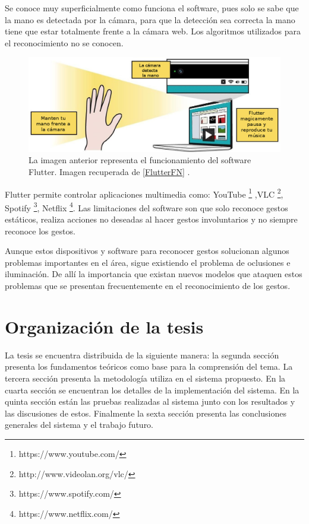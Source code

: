 Se conoce muy superficialmente como funciona el software, pues solo se sabe que la mano es detectada por la cámara, para que la detección sea correcta la mano tiene que estar totalmente frente a la cámara web. Los algoritmos utilizados para el reconocimiento no se conocen.  
\begin{figure}[h!]
\begin{center}
\includegraphics[scale=.4]{./Figures/Flutter.jpg}
\end{center}
\caption{La imagen anterior representa el funcionamiento del software Flutter. Imagen recuperada de \ref{FlutterFN} .}
\label{fig:Flutter}
\end{figure}

Flutter permite controlar aplicaciones multimedia como: YouTube \footnote{https://www.youtube.com/} ,VLC \footnote{http://www.videolan.org/vlc/}, Spotify \footnote{https://www.spotify.com/}, Netflix \footnote{https://www.netflix.com/}. Las limitaciones del software son que solo reconoce gestos estáticos, realiza acciones no deseadas al hacer gestos involuntarios y no siempre reconoce los gestos.  


Aunque estos dispositivos y software para reconocer gestos solucionan algunos problemas importantes en el área, sigue existiendo el problema de oclusiones e iluminación.
De allí la importancia que existan nuevos modelos que ataquen estos problemas que se presentan frecuentemente en el reconocimiento de los gestos.


  
\section{Organizaci\'on de la tesis}\label{OrganizacionTesis}

La tesis se encuentra distribuida de la siguiente manera: la segunda sección presenta los fundamentos teóricos como base para la comprensión del tema. La tercera sección presenta la metodología utiliza en el sistema propuesto. En la cuarta sección se encuentran los detalles de la implementación del sistema. En la quinta sección están las pruebas realizadas al sistema junto con los resultados y las discusiones de estos. Finalmente la sexta sección presenta las conclusiones generales del sistema y el trabajo futuro. 

